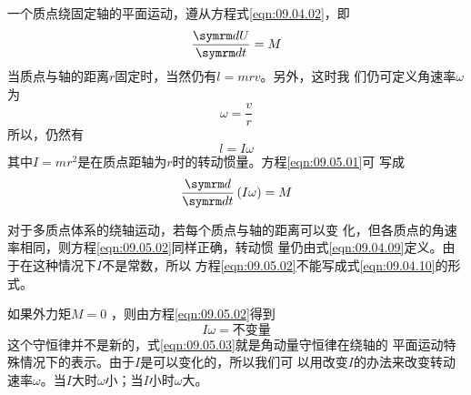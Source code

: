 \section[转动动能]{}\label{sec:09.05}

一个质点绕固定轴的平面运动，遵从方程式\eqref{eqn:09.04.02}，即
\begin{equation}\label{eqn:09.05.01}
 \frac { \dif U } { \dif t } = M
\end{equation}
当质点与轴的距离$ r $固定时，当然仍有$ l = m r v $。另外，这时我
们仍可定义角速率$ \omega $为
\begin{equation*}
 \omega = \frac { v } { r }
\end{equation*}
所以，仍然有
\begin{equation*}
 l = I \omega
\end{equation*}
其中$ I = m r ^ { 2 } $是在质点距轴为$ r $时的转动惯量。方程\eqref{eqn:09.05.01}可
写成
\begin{equation}\label{eqn:09.05.02}
 \frac { \dif } { \dif t } \left( I \omega \right) = M
\end{equation}

对于多质点体系的绕轴运动，若每个质点与轴的距离可以变
化，但各质点的角速率相同，则方程\eqref{eqn:09.05.02}同样正确，转动惯
量仍由式\eqref{eqn:09.04.09}定义。由于在这种情况下$ I $不是常数，所以
方程\eqref{eqn:09.05.02}不能写成式\eqref{eqn:09.04.10}的形式。

如果外力矩$ M = 0 $ ，则由方程\eqref{eqn:09.05.02}得到
\begin{equation}\label{eqn:09.05.03}
 I \omega = \text{不变量}
\end{equation}
这个守恒律并不是新的，式\eqref{eqn:09.05.03}就是角动量守恒律在绕轴的
平面运动特殊情况下的表示。由于$ I $是可以变化的，所以我们可
以用改变$ I $的办法来改变转动速率$ \omega $。当$ I $大时$ \omega $小；当$ I $小时$ \omega $大。

